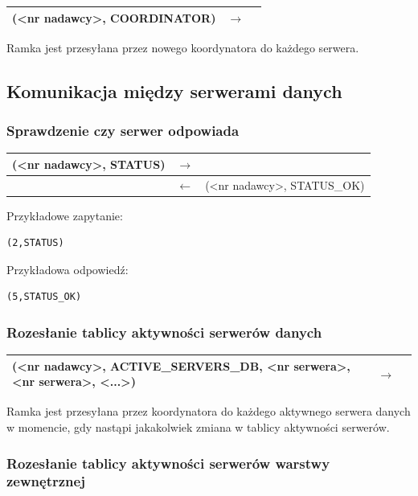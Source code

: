 \begin{longtable}{| p{} | p{}| p{} |} 
\hline
(<nr nadawcy>, COORDINATOR) & $\rightarrow$ &  \\ \hline
\end{longtable}

Ramka jest przesyłana przez nowego koordynatora do każdego serwera.

\subsection{Komunikacja między serwerami danych}

\subsubsection{Sprawdzenie czy serwer odpowiada}

\begin{longtable}{| p{} | p{}| p{} |} 
\hline
(<nr nadawcy>, STATUS) & $\rightarrow$ &  \\ \hline
 & $\leftarrow$ & (<nr nadawcy>, STATUS\_OK) \\ \hline
\end{longtable}

Przykładowe zapytanie:
\begin{lstlisting}[style=incode]
(2,STATUS)
\end{lstlisting}
Przykładowa odpowiedź:
\begin{lstlisting}[style=incode]
(5,STATUS_OK)
\end{lstlisting}

\subsubsection{Rozesłanie tablicy aktywności serwerów danych}

\begin{longtable}{| p{} | p{}| p{} |} 
\hline
(<nr nadawcy>, ACTIVE\_SERVERS\_DB, <nr serwera>, <nr serwera>, <...>)& $\rightarrow$ &  \\ \hline
\end{longtable}

Ramka jest przesyłana przez koordynatora do każdego aktywnego serwera danych w momencie, gdy nastąpi jakakolwiek zmiana w tablicy aktywności serwerów.

\subsubsection{Rozesłanie tablicy aktywności serwerów warstwy zewnętrznej}

